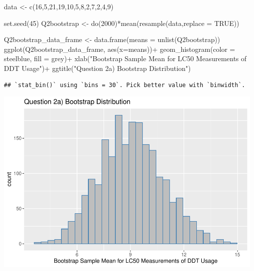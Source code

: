 \documentclass[
]{article}
\newenvironment{Shaded}{\begin{snugshade}}{\end{snugshade}}
\newcommand{\AttributeTok}[1]{\textcolor[rgb]{0.77,0.63,0.00}{#1}}
\newcommand{\ConstantTok}[1]{\textcolor[rgb]{0.00,0.00,0.00}{#1}}
\newcommand{\DecValTok}[1]{\textcolor[rgb]{0.00,0.00,0.81}{#1}}
\newcommand{\FunctionTok}[1]{\textcolor[rgb]{0.00,0.00,0.00}{#1}}
\newcommand{\NormalTok}[1]{#1}
\newcommand{\OtherTok}[1]{\textcolor[rgb]{0.56,0.35,0.01}{#1}}
\newcommand{\SpecialCharTok}[1]{\textcolor[rgb]{0.00,0.00,0.00}{#1}}
\newcommand{\StringTok}[1]{\textcolor[rgb]{0.31,0.60,0.02}{#1}}
\begin{document}
\begin{Shaded}
\begin{Highlighting}[]
\NormalTok{data }\OtherTok{\textless{}{-}} \FunctionTok{c}\NormalTok{(}\DecValTok{16}\NormalTok{,}\DecValTok{5}\NormalTok{,}\DecValTok{21}\NormalTok{,}\DecValTok{19}\NormalTok{,}\DecValTok{10}\NormalTok{,}\DecValTok{5}\NormalTok{,}\DecValTok{8}\NormalTok{,}\DecValTok{2}\NormalTok{,}\DecValTok{7}\NormalTok{,}\DecValTok{2}\NormalTok{,}\DecValTok{4}\NormalTok{,}\DecValTok{9}\NormalTok{)}

\FunctionTok{set.seed}\NormalTok{(}\DecValTok{45}\NormalTok{)}
\NormalTok{Q2bootstrap }\OtherTok{\textless{}{-}} \FunctionTok{do}\NormalTok{(}\DecValTok{2000}\NormalTok{)}\SpecialCharTok{*}\FunctionTok{mean}\NormalTok{(}\FunctionTok{resample}\NormalTok{(data,}\AttributeTok{replace =} \ConstantTok{TRUE}\NormalTok{))}

\NormalTok{Q2bootstrap\_data\_frame }\OtherTok{\textless{}{-}} \FunctionTok{data.frame}\NormalTok{(}\AttributeTok{means =} \FunctionTok{unlist}\NormalTok{(Q2bootstrap))}
\FunctionTok{ggplot}\NormalTok{(Q2bootstrap\_data\_frame, }\FunctionTok{aes}\NormalTok{(}\AttributeTok{x=}\NormalTok{means))}\SpecialCharTok{+}
  \FunctionTok{geom\_histogram}\NormalTok{(}\AttributeTok{color =} \StringTok{\textquotesingle{}steelblue\textquotesingle{}}\NormalTok{, }\AttributeTok{fill =} \StringTok{\textquotesingle{}grey\textquotesingle{}}\NormalTok{)}\SpecialCharTok{+}
  \FunctionTok{xlab}\NormalTok{(}\StringTok{"Bootstrap Sample Mean for LC50 Measurements of DDT Usage"}\NormalTok{)}\SpecialCharTok{+}
  \FunctionTok{ggtitle}\NormalTok{(}\StringTok{"Question 2a) Bootstrap Distribution"}\NormalTok{)}
\end{Highlighting}
\end{Shaded}

\begin{verbatim}
## `stat_bin()` using `bins = 30`. Pick better value with `binwidth`.
\end{verbatim}

\includegraphics{Assignment2_files/figure-latex/Q2-1.pdf}
\end{document}

